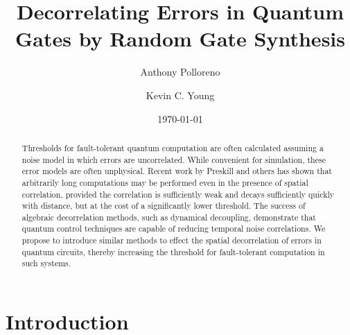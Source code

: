 \documentclass[aps,nofootinbib,pra,notitlepage,twocolumn]{revtex4-1}
\begin{document}
\title{Decorrelating Errors in Quantum Gates by Random Gate Synthesis}

\author{Anthony Polloreno}

\author{Kevin C. Young}

\date{\today}

\begin{abstract}
Thresholds for fault-tolerant quantum computation are often calculated assuming a noise model in which errors are uncorrelated. While convenient for simulation, these error models are often unphysical. Recent work by Preskill and others has shown that arbitrarily long computations may be performed even in the presence of spatial correlation, provided the correlation is sufficiently weak and decays sufficiently quickly with distance, but at the cost of a significantly lower threshold. The success of algebraic decorrelation methods, such as dynamical decoupling, demonstrate that quantum control techniques are capable of reducing temporal noise correlations. We propose to introduce similar methods to effect the spatial decorrelation of errors in quantum circuits, thereby increasing the threshold for fault-tolerant computation in such systems.
\end{abstract}

\pacs{}

\maketitle

\section{Introduction}

\end{document}
